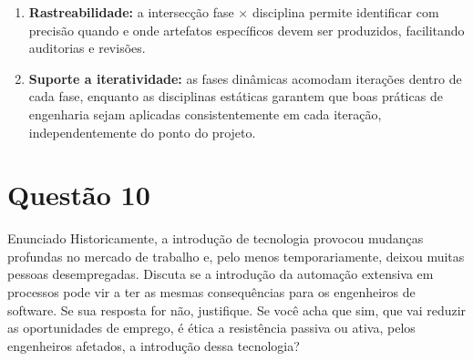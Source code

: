 \documentclass[12pt,a4paper]{article}
\begin{document}
\begin{resposta}
\begin{enumerate}
  \item \textbf{Rastreabilidade:} a intersecção fase $\times$ disciplina
        permite identificar com precisão quando e onde artefatos específicos
        devem ser produzidos, facilitando auditorias e revisões.

  \item \textbf{Suporte a iteratividade:} as fases dinâmicas acomodam iterações
        dentro de cada fase, enquanto as disciplinas estáticas garantem que
        boas práticas de engenharia sejam aplicadas consistentemente em cada
        iteração, independentemente do ponto do projeto.
\end{enumerate}

\end{resposta}

\section*{Questão 10}

\begin{questao}{Enunciado}
Historicamente, a introdução de tecnologia provocou mudanças profundas no
mercado de trabalho e, pelo menos temporariamente, deixou muitas pessoas
desempregadas. Discuta se a introdução da automação extensiva em processos
pode vir a ter as mesmas consequências para os engenheiros de software. Se
sua resposta for não, justifique. Se você acha que sim, que vai reduzir as
oportunidades de emprego, é ética a resistência passiva ou ativa, pelos
engenheiros afetados, a introdução dessa tecnologia?
\end{questao}
\end{document}
